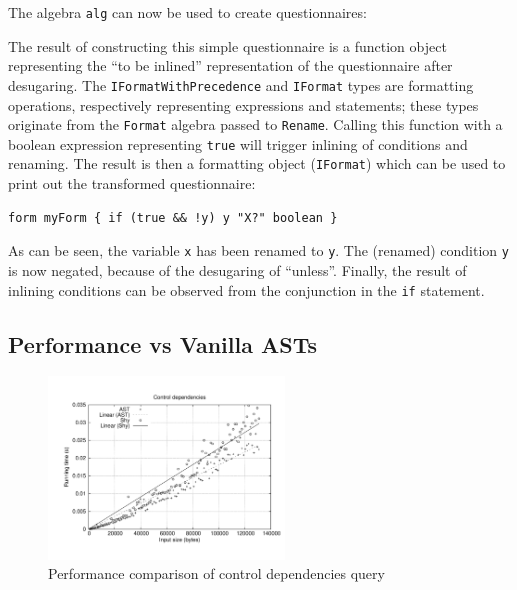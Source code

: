 The algebra \lstinline{alg} can now be used to create questionnaires:


The result of constructing this simple questionnaire is a function object representing the ``to be inlined'' representation of the questionnaire after desugaring.
The {\small\texttt{IFor\-mat\-With\-Pre\-cedence}} and \lstinline{IFormat} types are  formatting operations, respectively representing expressions and statements; these types originate from the \lstinline{Format} algebra passed to \lstinline{Rename}.
Calling this function with a boolean expression representing \lstinline{true} will trigger inlining of conditions and renaming. The result is then a formatting object (\lstinline{IFormat}) which can be used to print out the transformed questionnaire:

  \begin{lstlisting}[language=ql]
  form myForm { if (true && !y) y "X?" boolean }
  \end{lstlisting}

\noindent As can be seen, the variable \lstinline{x} has been renamed to \lstinline{y}.
The (renamed) condition \lstinline{y} is now negated, because of the desugaring of ``unless''.
Finally, the result of inlining conditions can be observed from the conjunction in the \lstinline[language=ql]{if} statement.


\subsection{\name Performance vs Vanilla ASTs}

\begin{figure}[t]
  \nocaptionrule
  \hspace*{-.05\textwidth}
  \includegraphics[width=0.56\textwidth]{plots/controldeps}
  \caption{Performance comparison of control dependencies query\label{FIG:controlPerf}}
\end{figure}

